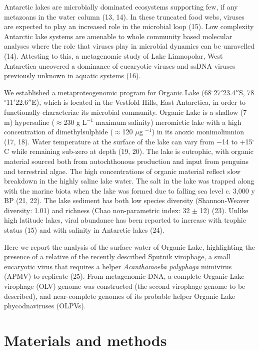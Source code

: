 Antarctic lakes are microbially dominated ecosystems supporting few, if any metazoans in the water column (13, 14). 
In these truncated food webs, viruses are expected to play an increased role in the microbial loop (15). 
Low complexity Antarctic lake systems are amenable to whole community based molecular analyses where the role that viruses play in microbial dynamics can be unravelled (14). 
Attesting to this, a metagenomic study of Lake Limnopolar, West Antarctica uncovered a dominance of eucaryotic viruses and ssDNA viruses previously unknown in aquatic systems (16). 

We established a metaproteogenomic program for Organic Lake (68$^{\circ}$27$'$23.4$''$S, 78$^{\circ}$11$'$22.6$''$E), which is located in the Vestfold Hills, East Antarctica, in order to functionally characterize its microbial community. 
Organic Lake is a shallow (7 m) hypersaline ($\approx$230 g L$^{-1}$ maximum salinity) meromictic lake with a high concentration of dimethylsulphide ($\approx$120 $\mu$g $^{-1}$) in its anoxic monimolimnion (17, 18). 
Water temperature at the surface of the lake can vary from $-$14 to $+$15$^{\circ}$C while remaining sub-zero at depth (19, 20). 
The lake is eutrophic, with organic material sourced both from autochthonous production and input from penguins and terrestrial algae. 
The high concentrations of organic material reflect slow breakdown in the highly saline lake water. 
The salt in the lake was trapped along with the marine biota when the lake was formed due to falling sea level c. 3,000 y BP (21, 22). The lake sediment has both low species diversity (Shannon-Weaver diversity: 1.01) and richness (Chao non-parametric index: 32 $\pm$ 12) (23). 
Unlike high latitude lakes, viral abundance has been reported to increase with trophic status (15) and with salinity in Antarctic lakes (24). 

Here we report the analysis of the surface water of Organic Lake, highlighting the presence of a relative of the recently described Sputnik virophage, a small eucaryotic virus that requires a helper \emph{Acanthamoeba polyphaga} mimivirus (APMV) to replicate (25). 
From metagenomic DNA, a complete Organic Lake virophage (OLV) genome was constructed (the second virophage genome to be described), and near-complete genomes of its probable helper Organic Lake phycodnaviruses (OLPVs).


\section{Materials and methods}


